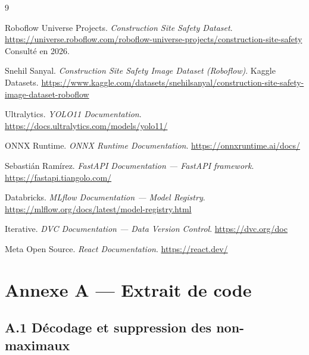 \documentclass[11pt,a4paper]{article}
\begin{document}
\begin{thebibliography}{9}

Roboflow Universe Projects.
\emph{Construction Site Safety Dataset}.
\url{https://universe.roboflow.com/roboflow-universe-projects/construction-site-safety}
Consulté en 2026.

Snehil Sanyal.
\emph{Construction Site Safety Image Dataset (Roboflow)}.
Kaggle Datasets.
\url{https://www.kaggle.com/datasets/snehilsanyal/construction-site-safety-image-dataset-roboflow}

Ultralytics.
\emph{YOLO11 Documentation}.
\url{https://docs.ultralytics.com/models/yolo11/}

ONNX Runtime.
\emph{ONNX Runtime Documentation}.
\url{https://onnxruntime.ai/docs/}

Sebastián Ramírez.
\emph{FastAPI Documentation --- FastAPI framework}.
\url{https://fastapi.tiangolo.com/}

Databricks.
\emph{MLflow Documentation --- Model Registry}.
\url{https://mlflow.org/docs/latest/model-registry.html}

Iterative.
\emph{DVC Documentation --- Data Version Control}.
\url{https://dvc.org/doc}

Meta Open Source.
\emph{React Documentation}.
\url{https://react.dev/}

\end{thebibliography}

\appendix
\section{Annexe A --- Extrait de code}

\subsection{A.1 Décodage et suppression des non-maximaux}
\end{document}
